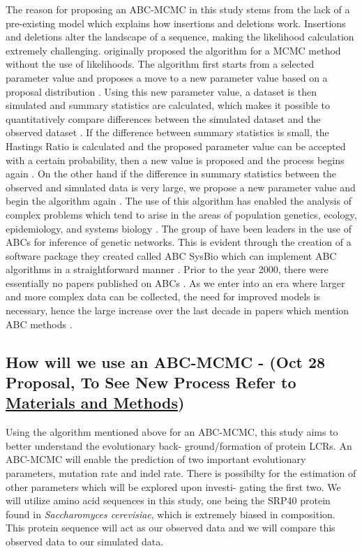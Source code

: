 \documentclass[10pt]{article}
\newcommand{\sclong}{\textit{Saccharomyces cerevisiae}\xspace}
\begin{document}
The reason for proposing an ABC-MCMC in this study stems from the lack of a pre-existing model which explains how
insertions and deletions work. Insertions and deletions alter the landscape of a sequence, making the likelihood calculation
extremely challenging. \citet{marjoram2003markov} originally proposed the algorithm for a MCMC method without the use of
likelihoods. The algorithm first starts from a selected parameter value and proposes a move to a new parameter value based
on a proposal distribution \citep{marjoram2003markov}. Using this new parameter value, a dataset is then simulated and summary
statistics are calculated, which makes it possible to quantitatively compare differences between the simulated dataset and the
observed dataset \citep{marjoram2003markov}. If the difference between summary statistics is small, the Hastings Ratio is calculated
and the proposed parameter value can be accepted with a certain probability, then a new value is proposed and the process begins
again \citep{marjoram2003markov}. On the other hand if the difference in summary statistics between the observed and simulated
data is very large, we propose a new parameter value and begin the algorithm again \citep{marjoram2003markov, marjoram2013approximation}. The use of this algorithm has enabled the analysis of complex problems which tend to arise in the areas of population genetics, ecology, epidemiology, and systems biology \citep{sunnaaker2013approximate}. The group of \citet{liepe2010abc} have been leaders in the use of ABCs for inference of genetic networks. This is evident through the creation of a software package they created called ABC SysBio which can implement ABC algorithms in a straightforward manner \citep{liepe2010abc, marjoram2013approximation}. Prior to the year 2000, there were essentially no papers published on ABCs \citep{marjoram2013approximation}. As we enter into an era where larger and more complex data can be collected, the need for improved models is necessary, hence the large increase over the last decade in papers which mention ABC methods \citep{marjoram2013approximation}.

\subsection{How will we use an ABC-MCMC - (Oct 28 Proposal, To See New Process Refer to \hyperref[methods]{Materials and Methods})}
Using the algorithm mentioned above for an ABC-MCMC, this study aims to better understand the evolutionary back-
ground/formation of protein LCRs. An ABC-MCMC will enable the prediction of two important evolutionary parameters,
mutation rate and indel rate. There is possibilty for the estimation of other parameters which will be explored upon investi-
gating the first two. We will utilize amino acid sequences in this study, one being the SRP40 protein found in \sclong, which is extremely biased in composition. This protein sequence will act as our observed data and we will compare
this observed data to our simulated data.
\end{document}
